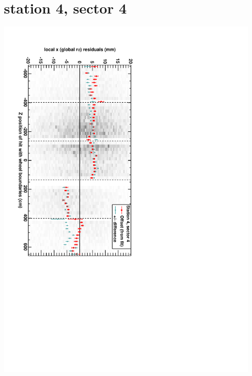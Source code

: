 \documentclass[compress]{beamer}
\begin{document}
\section*{station 4, sector 4}
\begin{frame} \vfill \mbox{\hspace{-1 cm}\includegraphics[height=1.2\linewidth, angle=90]{DTrphiVsZ_st4_sr04.pdf}} \end{frame}
\end{document}
